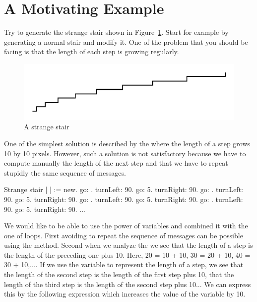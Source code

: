 \section{A Motivating Example}

Try to generate the strange stair shown in
Figure~\ref{fig:strangestair}. Start for example by generating a
normal stair and modify it. One of the problem that you should be
facing is that the length of each step is growing regularly.

\begin{figure}[!htbp]
\centerline{\includegraphics[width=12cm]{varLoopsFlatStair}}
\caption{A strange stair}
\label{fig:strangestair}
\end{figure}

One of the simplest solution is described by the
 where the length of a step grows 10 by
10 pixels. However, such a solution is not satisfactory because we have to compute manually the length of the next step and that we have to
repeat stupidly the same sequence of messages.

\begin{scriptwithtitle}{Strange stair}\label{src:strange1}
| \caro |
\caro := \Turtle new.
\caro go: .
\caro turnLeft: 90.
\caro go: 5. 
\caro turnRight: 90.
\caro go: .
\caro turnLeft: 90.
\caro go: 5. 
\caro turnRight: 90.
\caro go: .
\caro turnLeft: 90.
\caro go: 5. 
\caro turnRight: 90.
\caro go: .
\caro turnLeft: 90.
\caro go: 5. 
\caro turnRight: 90.
...
\end{scriptwithtitle}

We would like to be able to use the power of variables and combined it with the one of loops. First avoiding to repeat the sequence of messages can be possible using the \timesRepeat method.  Second when we analyze the  we see that the length of a step is the length of the preceding one plus 10. Here, 20 = 10 + 10, 30 = 20 + 10, 40 = 30 + 10,.... If we use the variable  to represent the length of a step, we see that the length of the second step is the length of the first step plus 10, that the length of the third step is the length of the second step plus 10... We can express this by the
following expression  which increases the value of the variable  by 10.

